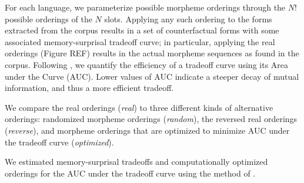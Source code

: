 \documentclass[11pt,letterpaper]{article}
\newcommand{\citet}{\Textcite}
\begin{document}
For each language, we parameterize possible morpheme orderings through the $N!$ possible orderings of the $N$ slots.
Applying any such ordering to the forms extracted from the corpus results in a set of counterfactual forms with some associated memory-surprisal tradeoff curve; in particular, applying the real orderings (Figure REF) results in the actual morpheme sequences as found in the corpus.
Following \citet{Hahn2020modeling}, we quantify the efficiency of a tradeoff curve using its Area under the Curve (AUC). Lower values of AUC indicate a steeper decay of mutual information, and thus a more efficient tradeoff.

We compare the real orderings (\textit{real}) to three different kinds of alternative orderings: randomized morpheme orderings (\textit{random}), the reversed real orderings (\textit{reverse}), and morpheme orderings that are optimized to minimize AUC under the tradeoff curve (\textit{optimized}). 

We estimated memory-surprisal tradeoffs and computationally optimized orderings for the AUC under the tradeoff curve using the method of \citet{Hahn2020modeling}.
\end{document}

